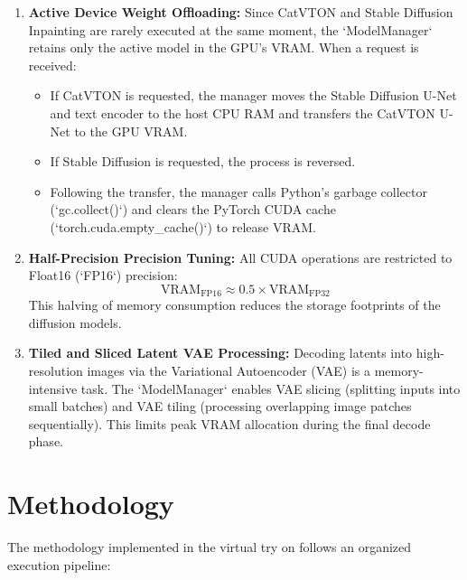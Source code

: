 \documentclass[12pt, a4paper]{report}
\begin{document}
\begin{enumerate}
\item \textbf{Active Device Weight Offloading:} Since CatVTON and Stable Diffusion Inpainting are rarely executed at the same moment, the `ModelManager` retains only the active model in the GPU's VRAM. When a request is received:
\begin{itemize}
\item If CatVTON is requested, the manager moves the Stable Diffusion U-Net and text encoder to the host CPU RAM and transfers the CatVTON U-Net to the GPU VRAM.
\item If Stable Diffusion is requested, the process is reversed.
\item Following the transfer, the manager calls Python's garbage collector (`gc.collect()`) and clears the PyTorch CUDA cache (`torch.cuda.empty_cache()`) to release VRAM.
\end{itemize}
\item \textbf{Half-Precision Precision Tuning:} All CUDA operations are restricted to Float16 (`FP16`) precision:
\[
\text{VRAM}_{\text{FP16}} \approx 0.5 \times \text{VRAM}_{\text{FP32}}
\]
This halving of memory consumption reduces the storage footprints of the diffusion models.
\item \textbf{Tiled and Sliced Latent VAE Processing:} Decoding latents into high-resolution images via the Variational Autoencoder (VAE) is a memory-intensive task. The `ModelManager` enables VAE slicing (splitting inputs into small batches) and VAE tiling (processing overlapping image patches sequentially). This limits peak VRAM allocation during the final decode phase.
\end{enumerate}

\section{Methodology}

The methodology implemented in the virtual try on follows an organized execution pipeline:
\end{document}
